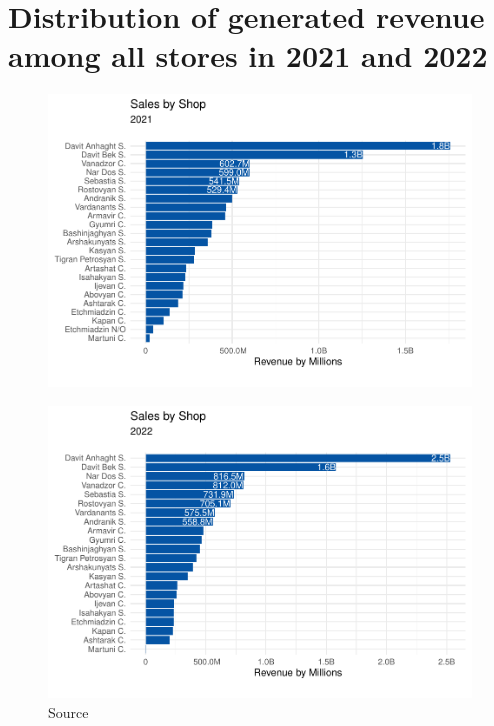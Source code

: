 \documentclass[conference]{IEEEtran}
\begin{document}
\section{Distribution of generated revenue among all stores in 2021 and 2022}
\label{app:sales-distribution}
\begin{figure}[htbp]
\centering
\includegraphics[width=\columnwidth,keepaspectratio]{./figures/sales_by_shop_2021_sales.pdf}
\caption{\cite{RevenuDistribution}}
\label{fig:sales-by-shop-2021}
\end{figure}


\begin{figure}[htbp]
\centering
\includegraphics[width=\columnwidth,keepaspectratio]{./figures/sales_by_shop_2022_sales.pdf}
\caption{Source \cite{RevenuDistribution}}
\label{fig:sales-by-shop-2022}
\end{figure}
\end{document}

